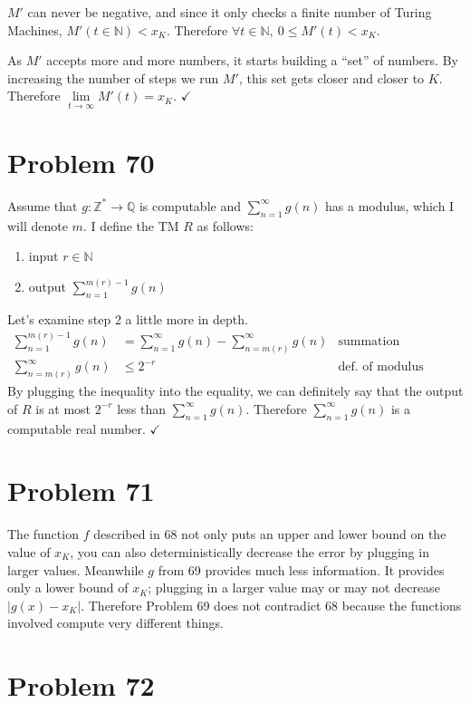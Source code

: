 \documentclass[11pt]{article}
\let\imp\rightarrow
\begin{document}
$M'$ can never be negative, and since it only checks a finite number of Turing Machines, $M'(t \in \mathbb{N}) < x_K$.
Therefore $\forall t \in \mathbb{N},\ 0 \leq M'(t) < x_K$.

As $M'$ accepts more and more numbers, it starts building a ``set'' of numbers.
By increasing the number of steps we run $M'$, this set gets closer and closer to $K$.
Therefore $\lim \limits _{t \imp \infty} M'(t) = x_K$. $\checkmark$


\section*{Problem 70}

Assume that $g: \mathbb{Z}^* \imp \mathbb{Q}$ is computable and $\sum _{n=1} ^\infty g(n)$ has a modulus, which I will denote $m$.
I define the TM $R$ as follows:
\begin{enumerate}
	\item input $r \in \mathbb{N}$
	\item output $\sum _{n= 1} ^{m(r) -1} g(n)$
\end{enumerate}

Let's examine step 2 a little more in depth.
\begin{align*}
	\sum \limits _{n=1} ^{m(r) -1} g(n) &= \sum \limits _{n=1} ^\infty g(n) - \sum \limits _{n=m(r)} ^\infty g(n) & \text{summation properties} \\
	\sum \limits _{n=m(r)} ^\infty g(n) &\leq 2^{-r} & \text{def. of modulus}
\end{align*}
By plugging the inequality into the equality, we can definitely say that the output of $R$ is at most $2^{-r}$ less than $\sum _{n=1} ^\infty g(n)$.
Therefore $\sum _{n=1} ^\infty g(n)$ is a computable real number. $\checkmark$

\section*{Problem 71}

The function $f$ described in 68 not only puts an upper and lower bound on the value of $x_K$, you can also deterministically decrease the error by plugging in larger values.
Meanwhile $g$ from 69 provides much less information. It provides only a lower bound of $x_K$; plugging in a larger value may or may not decrease $|g(x) - x_K|$.
Therefore Problem 69 does not contradict 68 because the functions involved compute very different things.


\section*{Problem 72}
\end{document}
